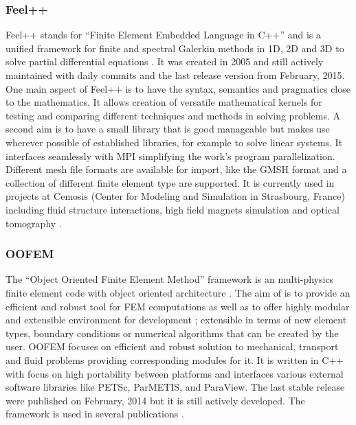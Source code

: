   \subsubsection{Feel++}
  Feel++ stands for "`Finite Element Embedded Language in C++"' and is a unified framework for finite and spectral Galerkin methods in 1D, 2D and 3D to solve partial differential equations \cite{prud2012feel++}. It was created in 2005 and still actively maintained with daily commits and the last release version from February, 2015.
  One main aspect of Feel++ is to have the syntax, semantics and pragmatics close to the mathematics. It allows creation of versatile mathematical kernels for testing and comparing different techniques and methods in solving problems. A second aim is to have a small library that is good manageable but makes use wherever possible of established libraries, for example to solve linear systems.
  It interfaces seamlessly with MPI simplifying the work's program parallelization. Different mesh file formats are available for import, like the GMSH format and a collection of different finite element type are supported.
  It is currently used in projects at Cemosis (Center for Modeling and Simulation in Strasbourg, France) including fluid structure interactions, high field magnets simulation and optical tomography \cite{feelpp}.



  \subsubsection{OOFEM}\cite{oofem}
  The "`Object Oriented Finite Element Method"' framework is an multi-physics finite element code with object oriented architecture \cite{patzak2001design}. The aim of is to provide an efficient and robust tool for FEM computations as well as to offer highly modular and extensible environment for development \cite{oofem}; extensible in terms of new element types, boundary conditions or numerical algorithms that can be created by the user. OOFEM focuses on efficient and robust solution to mechanical, transport and fluid problems providing corresponding modules for it. It is written in C++ with focus on high portability between platforms and interfaces various external software libraries like PETSc, ParMETIS, and ParaView. The last stable release were published on February, 2014 but it is still actively developed. The framework is used in several publications \cite{oofemPubs}.
  
  
  
